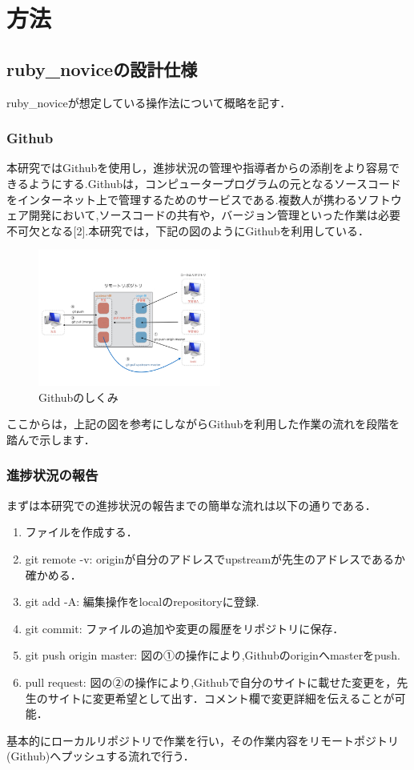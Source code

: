 \section{方法}
\subsection{ruby\_noviceの設計仕様}
ruby\_noviceが想定している操作法について概略を記す．

\subsubsection{Github}
本研究ではGithubを使用し，進捗状況の管理や指導者からの添削をより容易できるようにする.Githubは，コンピュータープログラムの元となるソースコードをインターネット上で管理するためのサービスである.複数人が携わるソフトウェア開発において,ソースコードの共有や，バージョン管理といった作業は必要不可欠となる[2].本研究では，下記の図のようにGithubを利用している．

\begin{figure}[htbp]\begin{center}
\includegraphics[width=6cm,bb=0 0 442 500]{../figs/./ruby_novice.002.jpg}
\caption{Githubのしくみ}
\label{default}\end{center}\end{figure}
ここからは，上記の図を参考にしながらGithubを利用した作業の流れを段階を踏んで示します．

\subsubsection{進捗状況の報告}
まずは本研究での進捗状況の報告までの簡単な流れは以下の通りである．

\begin{enumerate}
\item ファイルを作成する．
\item git remote -v: originが自分のアドレスでupstreamが先生のアドレスであるか確かめる．
\item git add -A: 編集操作をlocalのrepositoryに登録.
\item git commit: ファイルの追加や変更の履歴をリポジトリに保存．
\item git push origin master: 図の①の操作により,Githubのoriginへmasterをpush.
\item pull request: 図の②の操作により,Githubで自分のサイトに載せた変更を，先生のサイトに変更希望として出す．コメント欄で変更詳細を伝えることが可能．
\end{enumerate}
基本的にローカルリポジトリで作業を行い，その作業内容をリモートポジトリ(Github)へプッシュする流れで行う．

